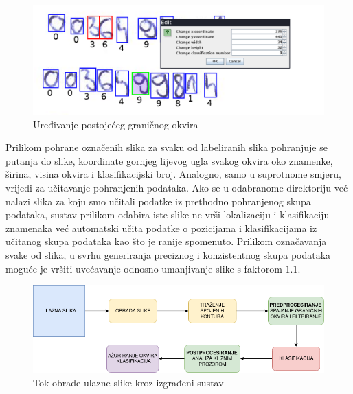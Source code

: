 \documentclass[times, utf8, diplomski]{fer}
\theoremstyle{definition}
\begin{document}
\begin{figure}[h]
	\centering
	\includegraphics[scale=0.5]{edit.png}
	\caption{Uređivanje postojećeg graničnog okvira}
\end{figure}
Prilikom pohrane označenih slika za svaku od labeliranih slika pohranjuje se putanja do slike, koordinate gornjeg lijevog ugla svakog okvira oko znamenke, širina, visina okvira i klasifikacijski broj. Analogno, samo u suprotnome smjeru, vrijedi za učitavanje pohranjenih podataka. Ako se u odabranome direktoriju već nalazi slika za koju smo učitali podatke iz prethodno pohranjenog skupa podataka, sustav prilikom odabira iste slike ne vrši lokalizaciju i klasifikaciju znamenaka već automatski učita podatke o pozicijama i klasifikacijama iz učitanog skupa podataka kao što je ranije spomenuto.
\newline
Prilikom označavanja svake od slika, u svrhu generiranja preciznog i konzistentnog skupa podataka moguće je vršiti uvećavanje odnosno umanjivanje slike s faktorom $1.1$.
\newline
\newline
\begin{figure}[h]
	\centering
	\includegraphics[scale=0.6]{system_arhitecture.png}
	\caption{Tok obrade ulazne slike kroz izgrađeni sustav}
\end{figure}
\end{document}
